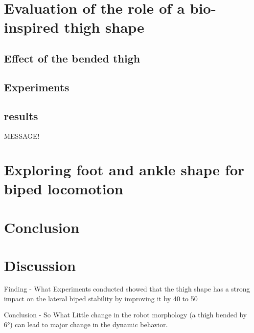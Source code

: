 \section{Evaluation of the role of a bio-inspired thigh shape} %
\label{sec:evaluation-thigh}

\subsection{Effect of the bended thigh} %
\label{sub:effect_of_the_bended_thigh}


\subsection{Experiments} %
\label{sub:experiments}

\subsection{results} %
\label{sub:results}

MESSAGE!


\section{Exploring foot and ankle shape for biped locomotion} %
\label{sec:exploring_foot_and_ankle_shape_for_biped_locomotion}


\section{Conclusion} %
\label{sec:conclusion}


\section{Discussion} %
\label{sec:discussion}


Finding - What
Experiments conducted showed that the thigh shape has a strong impact on the lateral biped stability by improving it by 40 to 50%

Conclusion - So What
Little change in the robot morphology (a thigh bended by 6°) can lead to major change in the dynamic behavior.


